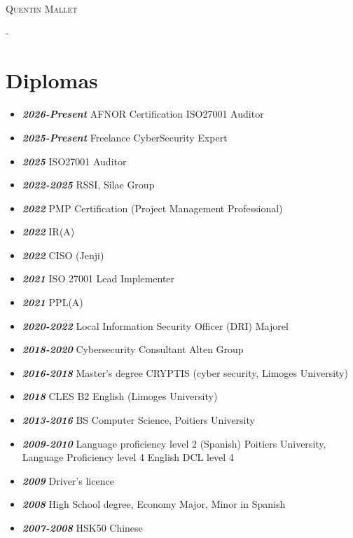 \documentclass[a4paper, oneside, final]{scrartcl} %
\begin{document}
\begin{center} %


{\fontsize{36}{36}\selectfont\scshape Quentin
Mallet} %

\vspace{1.5cm} %

-\section*{Diplomas}
\begin{itemize}
\item\textit{\textbf{2026-Present}} AFNOR Certification ISO27001 Auditor
\item\textit{\textbf{2025-Present}} Freelance CyberSecurity Expert
\item\textit{\textbf{2025}} ISO27001 Auditor
\item\textit{\textbf{2022-2025}} RSSI, Silae Group
\item\textit{\textbf{2022}} PMP Certification (Project Management Professional)
\item\textit{\textbf{2022}} IR(A)
\item\textit{\textbf{2022}} CISO (Jenji)
\item\textit{\textbf{2021}} ISO 27001 Lead Implementer
\item\textit{\textbf{2021}} PPL(A)
\item \textit{\textbf{2020-2022}} Local Information Security Officer (DRI) Majorel
\item \textit{\textbf{2018-2020}} Cybersecurity Consultant Alten Group
\item \textit{\textbf{2016-2018}} Master's degree CRYPTIS (cyber security, Limoges University)
\item\textit{\textbf{2018}} CLES B2 English (Limoges University)
\item \textit{\textbf{2013-2016}} BS Computer Science, Poitiers University
\item \textit{\textbf{2009-2010}} Language proficiency level 2 (Spanish) Poitiers University, Language Proficiency level 4 English
DCL level 4
\item \textit{\textbf{2009}} Driver's licence
\item \textit{\textbf{2008} } High School degree, Economy Major, Minor in Spanish
\item \textit{\textbf{2007-2008}}  HSK50 Chinese
\end{itemize}





\end{center}
\end{document}

